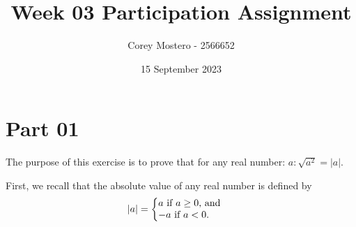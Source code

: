 \documentclass{article}
\title{Week 03 Participation Assignment}
\author{Corey Mostero - 2566652}
\date{15 September 2023}
\begin{document}
\newcommand{\hr}{\par\noindent\rule{\textwidth}{0.4pt}}

\newcommand{\bc}[1]{
	\begin{equation*}
		\begin{boxed}
			{#1}
		\end{boxed}
	\end{equation*}
}

\newcommand{\cond}[2]{
	\ifmmode
	{#1} \quad {#2}
	\else
	$$ {#1} \quad {#2} $$
	\fi
}

\newcommand{\matr}[1]{
	\ifmmode \bm{#1}
	\else \textit{\textbf{#1}}
	\fi
}
\newcommand{\vect}[1]{
	\ifmmode \mathbf{#1}
	\else \textbf{#1}
	\fi
}


\maketitle
\newpage

\tableofcontents

\section{Part 01}

The purpose of this exercise is to prove that for any real number: $ a: \sqrt{ a^2 } = \left| a \right| $.

First, we recall that the absolute value of any real number is defined by
\begin{align*}
	|a| & =
	\left\{
	\begin{array}{@{}l@{}}
		a \text{ if $ a \geq 0 $, and } \\
		-a \text{ if $ a < 0 $. }
	\end{array}
	\right.
\end{align*}
\end{document}
